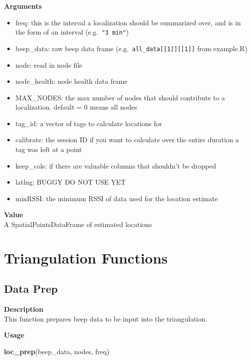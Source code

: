 \documentclass[
]{book}
\newenvironment{Shaded}{\begin{snugshade}}{\end{snugshade}}
\newcommand{\KeywordTok}[1]{\textcolor[rgb]{0.13,0.29,0.53}{\textbf{#1}}}
\newcommand{\NormalTok}[1]{#1}
\providecommand{\tightlist}{%
  \setlength{\itemsep}{0pt}\setlength{\parskip}{0pt}}
\begin{document}
\textbf{Arguments}

\begin{itemize}
\tightlist
\item
  freq: this is the interval a localization should be summarized over, and is in the form of an interval (e.g.~\texttt{"3\ min"})\\
\item
  beep\_data: raw beep data frame (e.g.~\texttt{all\_data{[}{[}1{]}{]}{[}{[}1{]}{]}} from example.R)\\
\item
  node: read in node file\\
\item
  node\_health: node health data frame
\item
  MAX\_NODES: the max number of nodes that should contribute to a localization. default = 0 means all nodes
\item
  tag\_id: a vector of tags to calculate locations for
\item
  calibrate: the session ID if you want to calculate over the entire duration a tag was left at a point
\item
  keep\_cols: if there are valuable columns that shouldn't be dropped
\item
  latlng: BUGGY DO NOT USE YET
\item
  minRSSI: the minimum RSSI of data used for the location estimate
\end{itemize}

\textbf{Value}\\
A SpatialPointsDataFrame of estimated locations

\hypertarget{triangulation-functions}{%
\section{Triangulation Functions}\label{triangulation-functions}}

\hypertarget{data-prep}{%
\subsection{Data Prep}\label{data-prep}}

\textbf{Description}\\
This function prepares beep data to be input into the triangulation.

\textbf{Usage}

\begin{Shaded}
\begin{Highlighting}[]
\KeywordTok{loc_prep}\NormalTok{(beep_data, nodes, freq) }
\end{Highlighting}
\end{Shaded}
\end{document}
